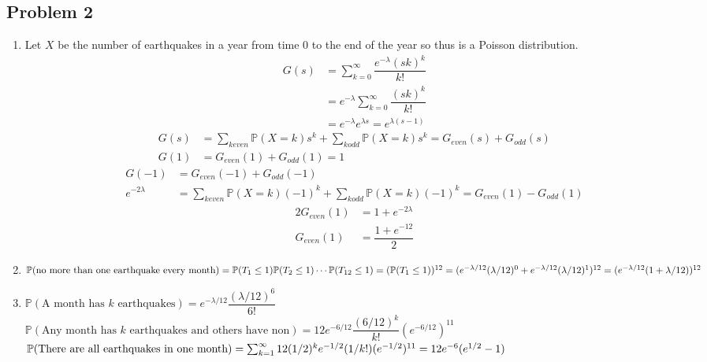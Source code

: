 \documentclass[12pt, letterpaper]{article}
\theoremstyle{definition}
\renewcommand{\P}{\mathbb{P}}
\renewcommand{\t}[1]{\text{#1}}
\begin{document}
\subsection*{Problem 2}
\begin{enumerate}
    \item Let $X$ be the number of earthquakes in a year from time 0 to the end of the year so thus is a Poisson distribution.\\
    \begin{align*}
        G(s)&=\sum_{k=0}^{\infty}\dfrac{e^{-\lambda}(sk)^k}{k!}\\
            &=e^{-\lambda}\sum_{k=0}^{\infty}\dfrac{(sk)^k}{k!}\\
            &=e^{-\lambda}e^{\lambda s}=e^{\lambda(s-1)}
    \end{align*}
    \begin{align*}
        G(s)&=\sum_{k even}\P(X=k)s^k + \sum_{k odd}\P(X=k)s^k=G_{even}(s)+G_{odd}(s)\\
        G(1)&=G_{even}(1)+G_{odd}(1)=1
    \end{align*}
    \begin{align*}
        G(-1)&=G_{even}(-1)+G_{odd}(-1)\\
        e^{-2\lambda}&=\sum_{k even}\P(X=k)(-1)^k + \sum_{k odd}\P(X=k)(-1)^k=G_{even}(1)-G_{odd}(1)
    \end{align*}
    \begin{align*}
        2G_{even}(1)&=1+e^{-2\lambda}\\
        G_{even}(1)&=\dfrac{1+e^{-12}}{2}
    \end{align*}
    \item $\P(\t{no more than one earthquake every month})=\P(T_1 \leq 1)\P(T_2 \leq 1)\cdots\P(T_{12} \leq 1)\\
    =(\P(T_1 \leq 1))^{12}=(e^{-\lambda/12}(\lambda/12)^0+e^{-\lambda/12}(\lambda/12)^1)^{12}=(e^{- \lambda/12}(1+\lambda/12))^{12}$
    \item $\P(\t{A month has $k$ earthquakes})=e^{-\lambda/12}\dfrac{(\lambda/12)^6}{6!}$\\
    $\P(\t{Any month has $k$ earthquakes and others have non})=12e^{-6/12}\dfrac{(6/12)^k}{k!}(e^{-6/12})^{11}$\\
    $\P(\t{There are all earthquakes in one month})=\sum_{k=1}^{\infty}12(1/2)^ke^{-1/2}(1/k!)(e^{-1/2})^{11}\\=12e^{-6}(e^{1/2}-1)$
\end{enumerate}

\newpage
\end{document}
